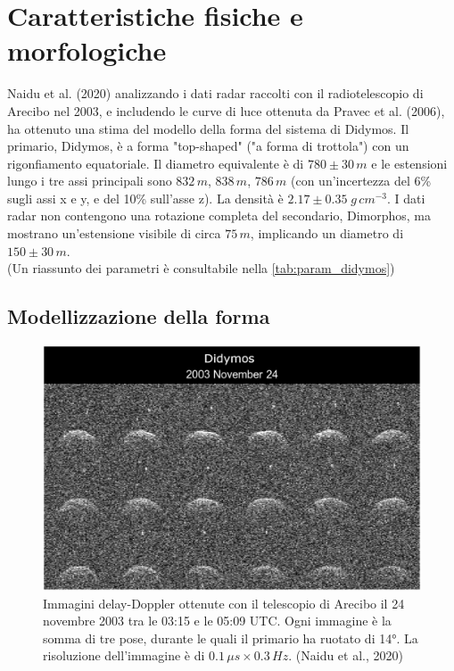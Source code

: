 \documentclass[a4paper,11pt,openright]{book}
\begin{document}
\section{Caratteristiche fisiche e morfologiche}
Naidu et al. (2020) analizzando i dati radar raccolti con il radiotelescopio di Arecibo nel 2003, e includendo le curve di luce ottenuta da Pravec et al. (2006), ha ottenuto una stima del modello della forma del sistema di Didymos. Il primario, Didymos, è a forma "top-shaped" ("a forma di trottola") con un rigonfiamento equatoriale. Il diametro equivalente è di $780\pm 30\,m$ e le estensioni lungo i tre assi principali sono $832\,m$, $838\,m$, $786\,m$ (con un'incertezza del 6\% sugli assi x e y, e del 10\% sull'asse z). La densità è $2.17\pm 0.35\;g\,cm^{-3}$. I dati radar non contengono una rotazione completa del secondario, Dimorphos, ma mostrano un'estensione visibile di circa $75\,m$, implicando un diametro di $150\pm 30\,m$.\\
(Un riassunto dei parametri è consultabile nella \cref{tab:param_didymos})

\subsection{Modellizzazione della forma}\label{sec:shape_model}

\begin{figure}[!h]
    \centering
    \includegraphics[scale=1.3]{figure/didymos_241103.jpg}
    \caption[Immagini delay-Doppler ottenute con il telescopio di Arecibo.]{Immagini delay-Doppler ottenute con il telescopio di Arecibo il 24 novembre 2003 tra le 03:15 e le 05:09 UTC. Ogni immagine è la somma di tre pose, durante le quali il primario ha ruotato di 14°. La risoluzione dell'immagine è di $0.1\,\mu s\times 0.3\,Hz$. (Naidu et al., 2020)}
    \label{fig:didymos_241103}
\end{figure}
\end{document}
